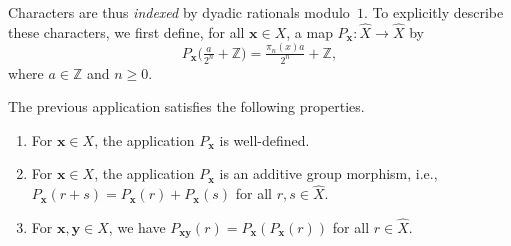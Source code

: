 \documentclass[12pt,reqno]{article}
\begin{document}
Characters are thus {\em indexed} by dyadic rationals modulo~$1$. 
To explicitly describe these characters, we first define, for all $\mathbf{x}\in X$, a map $P_\mathbf{x} \colon \widehat X \to \widehat X$ by
\[  P_\mathbf{x}\bigl(\tfrac{a}{2^n}+\mathbb{Z}\bigr)
    = \tfrac{\pi_n(x) a}{2^n} + \mathbb{Z},
\]
where $a\in\mathbb{Z}$ and $n\ge0$.

\begin{lemma}
    \label{lem:props_Px}
The previous application satisfies the following properties.
\begin{enumerate}
\item For $\mathbf{x}\in X$,  the application $P_\mathbf{x}$ is well-defined. 
\item For $\mathbf{x}\in X$,  the application $P_\mathbf{x}$ is an additive group morphism,  i.e., $P_\mathbf{x} (r + s) = P_\mathbf{x}(r) + P_\mathbf{x}(s)$ for all $r,s \in \widehat X$.
\item For $\mathbf{x}, \mathbf{y} \in X$,  we have $P_{\mathbf{x}\mathbf{y}}(r) = P_\mathbf{x}(P_\mathbf{x}(r))$ for all $r\in \widehat X$.
\end{enumerate}
\end{lemma}
\end{document}
